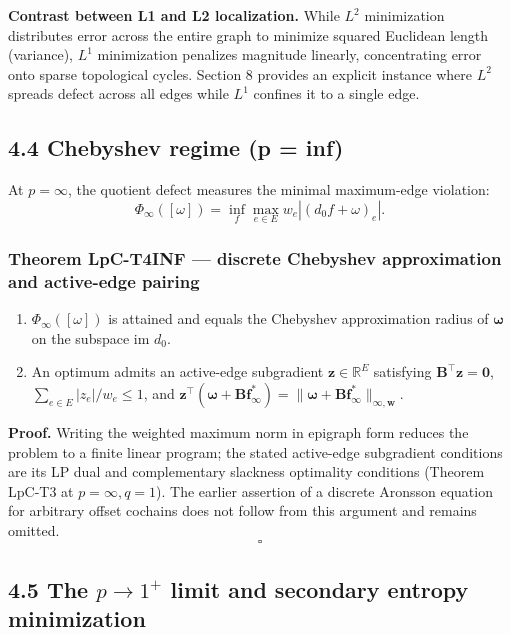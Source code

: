 \documentclass[
]{article}
\providecommand{\tightlist}{%
  \setlength{\itemsep}{0pt}\setlength{\parskip}{0pt}}
\providecommand{\tightlist}{%
  \setlength{\itemsep}{0pt}\setlength{\parskip}{0pt}}
\begin{document}
\textbf{Contrast between L1 and L2 localization.} While \(L^2\) minimization distributes error across the entire graph to minimize squared Euclidean length (variance), \(L^1\) minimization penalizes magnitude linearly, concentrating error onto sparse topological cycles. Section 8 provides an explicit instance where \(L^2\) spreads defect across all edges while \(L^1\) confines it to a single edge.

\subsection{4.4 Chebyshev regime (p = inf)}\label{chebyshev-regime-p-inf}

At \(p = \infty\), the quotient defect measures the minimal maximum-edge violation:
\[\Phi_\infty([\omega]) = \inf_f \max_{e \in E} w_e |(d_0 f + \omega)_e|.\]

\subsubsection{Theorem LpC-T4INF --- discrete Chebyshev approximation and active-edge pairing}\label{theorem-lpc-t4inf-discrete-chebyshev-approximation-and-active-edge-pairing}

\begin{enumerate}
\def\labelenumi{\arabic{enumi}.}
\tightlist
\item
  \(\Phi_\infty([\omega])\) is attained and equals the Chebyshev approximation radius of \(\boldsymbol{\omega}\) on the subspace \(\text{im } d_0\).
\item
  An optimum admits an active-edge subgradient \(\mathbf{z} \in \mathbb{R}^E\) satisfying \(\mathbf{B}^\top \mathbf{z} = \mathbf{0}\), \(\sum_{e \in E} |z_e|/w_e \le 1\), and \(\mathbf{z}^\top (\boldsymbol{\omega} + \mathbf{B}\mathbf{f}_\infty^*) = \|\boldsymbol{\omega} + \mathbf{B}\mathbf{f}_\infty^*\|_{\infty, \mathbf{w}}\).
\end{enumerate}

\textbf{Proof.} Writing the weighted maximum norm in epigraph form reduces the problem to a finite linear program; the stated active-edge subgradient conditions are its LP dual and complementary slackness optimality conditions (Theorem LpC-T3 at \(p = \infty, q = 1\)). The earlier assertion of a discrete Aronsson equation for arbitrary offset cochains does not follow from this argument and remains omitted. \[\square\]

\subsection{\texorpdfstring{4.5 The \(p \to 1^+\) limit and secondary entropy minimization}{4.5 The p \textbackslash to 1\^{}+ limit and secondary entropy minimization}}\label{the-p-to-1-limit-and-secondary-entropy-minimization}
\end{document}
